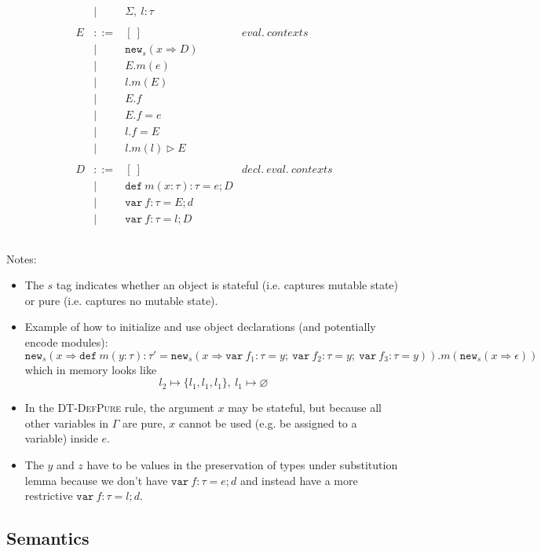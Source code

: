 \documentclass{llncs}
\newcommand{\keywadj}[1]{\mathtt{#1}}
\newcommand{\keyw}[1]{\keywadj{#1}~}
\begin{document}
\[\begin{array}{lll}
\begin{array}{lllr}
& | & \Sigma,~l : \tau\\
&&\\
E & ::= & [~] & eval.~ contexts\\
  & |   & \keywadj{new}_{s}(x \Rightarrow D) \\
  & |   & E.m(e)\\
  & |   & l.m(E)\\
  & |   & E.f \\
  & |   & E.f = e \\
  & |   & l.f = E \\
  & |   & l.m(l) \rhd E \\
&&\\
D & ::= & [~] & decl.~eval.~ contexts\\
  & |   & \keyw{def} m(x:\tau):\tau = e; D \\
  & |   & \keyw{var} f:\tau = E; d \\
  & |   & \keyw{var} f:\tau = l; D \\
&&\\
\end{array}
\end{array}
\]

\noindent Notes:

\begin{itemize}
\item The $s$ tag indicates whether an object is stateful (i.e. captures mutable state) or pure (i.e. captures no mutable state).
\item Example of how to initialize and use object declarations (and potentially encode modules):
\[
\keywadj{new}_{s}(x \Rightarrow \keyw{def} m(y : \tau) : \tau' = \keywadj{new}_{s}(x \Rightarrow \keyw{var} f_1 : \tau = y;~\keyw{var} f_2 : \tau = y;~\keyw{var} f_3 : \tau = y)).m(\keywadj{new}_{s} (x \Rightarrow \epsilon))
\]
which in memory looks like 
\[
l_2 \mapsto \{l_1,l_1,l_1\},~l_1 \mapsto \varnothing
\]
\item In the \textsc{DT-DefPure} rule, the argument $x$ may be stateful, but because all other variables in $\Gamma$ are pure, $x$ cannot be used (e.g. be assigned to a variable) inside $e$.
\item The $y$ and $z$ have to be values in the preservation of types under substitution lemma because we don't have $\keyw{var} f:\tau = e; d$ and instead have a more restrictive $\keyw{var} f:\tau = l;d$.
\end{itemize}


\newpage

\subsection{Semantics}
\end{document}
